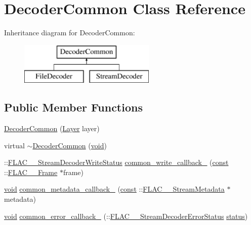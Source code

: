 \hypertarget{class_decoder_common}{}\section{Decoder\+Common Class Reference}
\label{class_decoder_common}
Inheritance diagram for Decoder\+Common\+:\begin{figure}[H]
\begin{center}
\leavevmode
\includegraphics[height=2.000000cm]{class_decoder_common}
\end{center}
\end{figure}
\subsection*{Public Member Functions}
\begin{DoxyCompactItemize}
\item 
\hyperlink{class_decoder_common_a5a227839a07cd136349bfa493a31967c}{Decoder\+Common} (\hyperlink{decoders_8c_a9a8118be7780e95363d631cbca7e7800}{Layer} layer)
\item 
virtual \hyperlink{class_decoder_common_aec3156d16683a7c6805bb4770d9f6524}{$\sim$\+Decoder\+Common} (\hyperlink{sound_8c_ae35f5844602719cf66324f4de2a658b3}{void})
\item 
\+::\hyperlink{group__flac__stream__decoder_ga73f67eb9e0ab57945afe038751bc62c8}{F\+L\+A\+C\+\_\+\+\_\+\+Stream\+Decoder\+Write\+Status} \hyperlink{class_decoder_common_aa8e093501b44a2f44b4c63fa1d0d6117}{common\+\_\+write\+\_\+callback\+\_\+} (\hyperlink{getopt1_8c_a2c212835823e3c54a8ab6d95c652660e}{const} \+::\hyperlink{struct_f_l_a_c_____frame}{F\+L\+A\+C\+\_\+\+\_\+\+Frame} $\ast$frame)
\item 
\hyperlink{sound_8c_ae35f5844602719cf66324f4de2a658b3}{void} \hyperlink{class_decoder_common_a4beb34bbe1256ff7b783058612e18aef}{common\+\_\+metadata\+\_\+callback\+\_\+} (\hyperlink{getopt1_8c_a2c212835823e3c54a8ab6d95c652660e}{const} \+::\hyperlink{struct_f_l_a_c_____stream_metadata}{F\+L\+A\+C\+\_\+\+\_\+\+Stream\+Metadata} $\ast$metadata)
\item 
\hyperlink{sound_8c_ae35f5844602719cf66324f4de2a658b3}{void} \hyperlink{class_decoder_common_ab401b9dcd27d35c5b0c51cedad51a5d8}{common\+\_\+error\+\_\+callback\+\_\+} (\+::\hyperlink{group__flac__stream__decoder_ga130e70bd9a73d3c2416247a3e5132ecf}{F\+L\+A\+C\+\_\+\+\_\+\+Stream\+Decoder\+Error\+Status} \hyperlink{rfft2d_test_m_l_8m_a1b5437a866e6f95107b07ba845bc1800}{status})
\end{DoxyCompactItemize}

